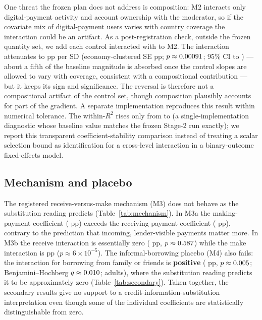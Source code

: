 One threat the frozen plan does not address is composition: M2 interacts only
digital-payment activity and account ownership with the moderator, so if the covariate mix
of digital-payment users varies with country coverage the interaction could be an artifact.
As a post-registration check, outside the frozen quantity set, we add each control
interacted with \lowcovz{} to M2. The interaction attenuates to \CtrlxModBeta{} pp per SD
(economy-clustered SE \CtrlxModSE{} pp; $p\approx0.00091$; 95\% CI \CtrlxModCIlo{} to
\CtrlxModCIhi{}) --- about a fifth of the baseline magnitude is absorbed once the control
slopes are allowed to vary with coverage, consistent with a compositional contribution ---
but it keeps its sign and significance. The reversal is therefore not a compositional
artifact of the control set, though composition plausibly accounts for part of the
gradient. A separate implementation reproduces this result within numerical tolerance. The
within-$R^2$ rises only from \WithinRtwoBase{} to \WithinRtwoFull{} (a single-implementation
diagnostic whose baseline value matches the frozen Stage-2 run exactly); we report this
transparent coefficient-stability comparison instead of treating a scalar selection bound as
identification for a cross-level interaction in a binary-outcome fixed-effects model.

\subsection{Mechanism and placebo}

The registered receive-versus-make mechanism (M3) does not behave as the substitution
reading predicts (Table~\ref{tab:mechanism}). In M3a the making-payment coefficient
(\MThreeAMake{} pp) exceeds the receiving-payment coefficient (\MThreeAReceive{} pp),
contrary to the prediction that incoming, lender-visible payments matter more. In M3b the
receive interaction is essentially zero (\MThreeBReceive{} pp, $p\approx0.587$)
while the make interaction is \MThreeBMake{} pp ($p\approx 6\times10^{-5}$). The
informal-borrowing placebo (M4) also fails: the interaction for borrowing from family or
friends is \textbf{positive} (\InformalBetaThree{} pp, $p\approx0.005$;
Benjamini--Hochberg $q\approx0.010$; \InformalN{} adults), where the
substitution reading predicts it to be approximately zero (Table~\ref{tab:secondary}).
Taken together, the secondary results give no support to a credit-information-substitution
interpretation even though some of the individual coefficients are statistically
distinguishable from zero.

